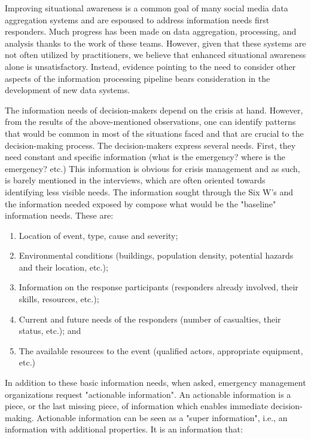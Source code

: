 Improving situational awareness is a common goal of many social media data aggregation systems and are espoused to address information needs first responders.
Much progress has been made on data aggregation, processing, and analysis thanks to the work of these teams.
However, given that these systems are not often utilized by practitioners, we believe that enhanced situational awareness alone is unsatisfactory.
Instead, evidence pointing to the need to consider other aspects of the information processing pipeline bears consideration in the development of new data systems.

The information needs of decision-makers depend on the crisis at hand.
However, from the results of the above-mentioned observations, one can identify patterns that would be common in most of the situations faced and that are crucial to the decision-making process.
The decision-makers express several needs.
First, they need constant and specific information (what is the emergency? where is the emergency? etc.)
This information is obvious for crisis management and as such, is barely mentioned in the interviews, which are often oriented towards identifying less visible needs.
The information sought through the Six W's and the information needed exposed by \textcite{jacksonInformationSharingEmergency2006} compose what would be the "baseline" information needs.
These are:

\begin{enumerate}
    \item Location of event, type, cause and severity;
    \item Environmental conditions (buildings, population density, potential hazards and their location, etc.);
    \item Information on the response participants (responders already involved, their skills, resources, etc.);
    \item Current and future needs of the responders (number of casualties, their status, etc.); and
    \item The available resources to the event (qualified actors, appropriate equipment, etc.)
\end{enumerate}

In addition to these basic information needs, when asked, emergency management organizations request "actionable information".
An actionable information is a piece, or the last missing piece, of information which enables immediate decision-making.
Actionable information can be seen as a "super information", i.e., an information with additional properties.
It is an information that:

